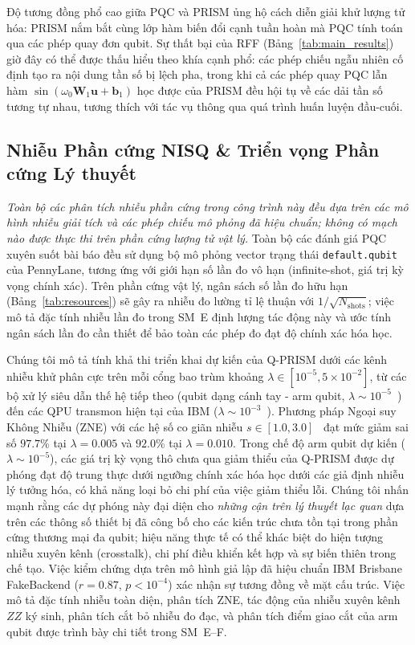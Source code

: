 \documentclass[10pt,twocolumn,letterpaper]{article}
\begin{document}
Độ tương đồng phổ cao giữa PQC và PRISM ủng hộ cách diễn giải khử lượng tử hóa: PRISM nắm bắt cùng lớp hàm biến đổi cạnh tuần hoàn mà PQC tính toán qua các phép quay đơn qubit. Sự thất bại của RFF (Bảng~\ref{tab:main_results}) giờ đây có thể được thấu hiểu theo khía cạnh phổ: các phép chiếu ngẫu nhiên cố định tạo ra nội dung tần số bị lệch pha, trong khi cả các phép quay PQC lẫn hàm $\sin(\omega_0 \mathbf{W}_1 \mathbf{u} + \mathbf{b}_1)$ học được của PRISM đều hội tụ về các dải tần số tương tự nhau, tương thích với tác vụ thông qua quá trình huấn luyện đầu-cuối.

\subsection{Nhiễu Phần cứng NISQ \& Triển vọng Phần cứng Lý thuyết}
\label{sec:hardware_outlook}

\textit{Toàn bộ các phân tích nhiễu phần cứng trong công trình này đều dựa trên các mô hình nhiễu giải tích và các phép chiếu mô phỏng đã hiệu chuẩn; không có mạch nào được thực thi trên phần cứng lượng tử vật lý.}
Toàn bộ các đánh giá PQC xuyên suốt bài báo đều sử dụng bộ mô phỏng vector trạng thái \texttt{default.qubit} của PennyLane, tương ứng với giới hạn số lần đo vô hạn (infinite-shot, giá trị kỳ vọng chính xác). Trên phần cứng vật lý, ngân sách số lần đo hữu hạn (Bảng~\ref{tab:resources}) sẽ gây ra nhiễu đo lường tỉ lệ thuận với $1/\sqrt{N_{\mathrm{shots}}}$; việc mô tả đặc tính nhiễu lần đo trong SM~E định lượng tác động này và ước tính ngân sách lần đo cần thiết để bảo toàn các phép đo đạt độ chính xác hóa học.

Chúng tôi mô tả tính khả thi triển khai dự kiến của Q-PRISM dưới các kênh nhiễu khử phân cực trên mỗi cổng bao trùm khoảng $\lambda \in [10^{-5}, 5 \times 10^{-2}]$, từ các bộ xử lý siêu dẫn thế hệ tiếp theo (qubit dạng cánh tay - arm qubit, $\lambda \sim 10^{-5}$~\cite{Kline:2025ecg}) đến các QPU transmon hiện tại của IBM ($\lambda \sim 10^{-3}$~\cite{Kim:2023bwr}). Phương pháp Ngoại suy Không Nhiễu (ZNE) với các hệ số co giãn nhiễu $s \in [1.0, 3.0]$~\cite{Temme:2016vkz, Giurgica-Tiron:2020rcf} đạt mức giảm sai số $97.7\%$ tại $\lambda = 0.005$ và $92.0\%$ tại $\lambda = 0.010$. Trong chế độ arm qubit dự kiến ($\lambda \sim 10^{-5}$), các giá trị kỳ vọng thô chưa qua giảm thiểu của Q-PRISM được dự phóng đạt độ trung thực dưới ngưỡng chính xác hóa học dưới các giả định nhiễu lý tưởng hóa, có khả năng loại bỏ chi phí của việc giảm thiểu lỗi. Chúng tôi nhấn mạnh rằng các dự phóng này đại diện cho \textit{những cận trên lý thuyết lạc quan} dựa trên các thông số thiết bị đã công bố cho các kiến trúc chưa tồn tại trong phần cứng thương mại đa qubit; hiệu năng thực tế có thể khác biệt do hiện tượng nhiễu xuyên kênh (crosstalk), chi phí điều khiển kết hợp và sự biến thiên trong chế tạo. Việc kiểm chứng dựa trên mô hình giả lập đã hiệu chuẩn IBM Brisbane FakeBackend ($r = 0.87$, $p < 10^{-4}$) xác nhận sự tương đồng về mặt cấu trúc. Việc mô tả đặc tính nhiễu toàn diện, phân tích ZNE, tác động của nhiễu xuyên kênh $ZZ$ ký sinh, phân tích cắt bỏ nhiễu đo đạc, và phân tích điểm giao cắt của arm qubit được trình bày chi tiết trong SM~E--F.
\end{document}
